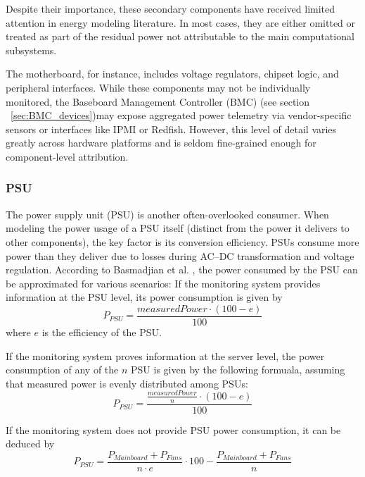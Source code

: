 Despite their importance, these secondary components have received limited attention in energy modeling literature. In most cases, they are either omitted or treated as part of the residual power not attributable to the main computational subsystems.

The motherboard, for instance, includes voltage regulators, chipset logic, and peripheral interfaces. While these components may not be individually monitored, the Baseboard Management Controller (BMC) (see section ~\ref{sec:BMC_devices})may expose aggregated power telemetry via vendor-specific sensors or interfaces like IPMI or Redfish. However, this level of detail varies greatly across hardware platforms and is seldom fine-grained enough for component-level attribution.
\subsubsection{PSU}
The power supply unit (PSU) is another often-overlooked consumer. When modeling the power usage of a PSU itself (distinct from the power it delivers to other components), the key factor is its conversion efficiency. PSUs consume more power than they deliver due to losses during AC–DC transformation and voltage regulation. According to Basmadjian et al. \parencite{basmadjianCloudComputingIts2012}, the power consumed by the PSU can be approximated for various scenarios:
If the monitoring system provides information at the PSU level, its power consumption is given by
\begin{equation}
    P_{PSU} = \frac{measuredPower \cdot (100 - e)}{100}
\end{equation}
where $e$ is the efficiency of the PSU.

If the monitoring system proves information at the server level, the power consumption of any of the $n$ PSU is given by the following formuala, assuming that measured power is evenly distributed among PSUs:
\begin{equation}
    P_{PSU} = \frac{\frac{measuredPower}{n} \cdot (100 - e)}{100}
\end{equation}

If the monitoring system does not provide PSU power consumption, it can be deduced by
\begin{equation}
    P_{PSU} = \frac{P_{Mainboard} + P_{Fans}}{n \cdot e} \cdot 100 - \frac{P_{Mainboard} + P_{Fans}}{n}
\end{equation}


